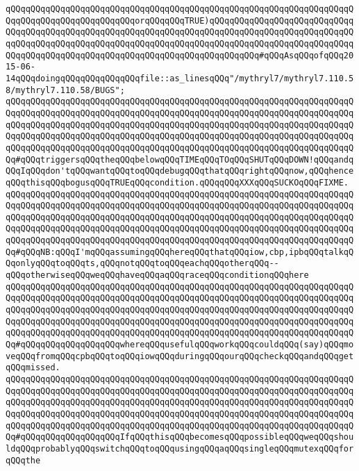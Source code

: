 \newline
\verb|qQQqqQQqqQQqqQQqqQQqqQQqqQQqqQQqqQQqqQQqqQQqqQQqqQQqqQQqqQQqqQQqqQQqqQQqqQQqqQQqqQQqqQQqqQQqqQQqorqQQqqQQqTRUE)qQQqqQQqqQQqqQQqqQQqqQQqqQQqqQQqqQQqqQQqqQQqqQQqqQQqqQQqqQQqqQQqqQQqqQQqqQQqqQQqqQQqqQQqqQQqqQQqqQQqqQQqqQQqqQQqqQQqqQQqqQQqqQQqqQQqqQQqqQQqqQQqqQQqqQQqqQQqqQQqqQQqqQQqqQQqqQQqqQQqqQQqqQQqqQQqqQQqqQQqqQQqqQQqqQQqqQQqqQQq#qQQqAsqQQqofqQQq2015-06-14qQQqdoingqQQqqQQqqQQqqQQqfile::as_linesqQQq"/mythryl7/mythryl7.110.58/mythryl7.110.58/BUGS";|\newline
\verb|qQQqqQQqqQQqqQQqqQQqqQQqqQQqqQQqqQQqqQQqqQQqqQQqqQQqqQQqqQQqqQQqqQQqqQQqqQQqqQQqqQQqqQQqqQQqqQQqqQQqqQQqqQQqqQQqqQQqqQQqqQQqqQQqqQQqqQQqqQQqqQQqqQQqqQQqqQQqqQQqqQQqqQQqqQQqqQQqqQQqqQQqqQQqqQQqqQQqqQQqqQQqqQQqqQQqqQQqqQQqqQQqqQQqqQQqqQQqqQQqqQQqqQQqqQQqqQQqqQQqqQQqqQQqqQQqqQQqqQQqqQQqqQQqqQQqqQQqqQQqqQQqqQQqqQQqqQQqqQQqqQQqqQQqqQQqqQQqqQQqqQQqqQQqqQQq#qQQqtriggersqQQqtheqQQqbelowqQQqTIMEqQQqTOqQQqSHUTqQQqDOWN!qQQqandqQQqIqQQqdon'tqQQqwantqQQqtoqQQqdebugqQQqthatqQQqrightqQQqnow,qQQqhenceqQQqthisqQQqbogusqQQqTRUEqQQqcondition.qQQqqQQqXXXqQQqSUCKOqQQqFIXME.|\newline
\newline
\verb|qQQqqQQqqQQqqQQqqQQqqQQqqQQqqQQqqQQqqQQqqQQqqQQqqQQqqQQqqQQqqQQqqQQqqQQqqQQqqQQqqQQqqQQqqQQqqQQqqQQqqQQqqQQqqQQqqQQqqQQqqQQqqQQqqQQqqQQqqQQqqQQqqQQqqQQqqQQqqQQqqQQqqQQqqQQqqQQqqQQqqQQqqQQqqQQqqQQqqQQqqQQqqQQqqQQqqQQqqQQqqQQqqQQqqQQqqQQqqQQqqQQqqQQqqQQqqQQqqQQqqQQqqQQqqQQqqQQqqQQqqQQqqQQqqQQqqQQqqQQqqQQqqQQqqQQqqQQqqQQqqQQqqQQqqQQqqQQqqQQqqQQqqQQqqQQq#qQQqNB:qQQqI'mqQQqassumingqQQqhereqQQqthatqQQqiow,cbp,ipbqQQqtalkqQQqonlyqQQqtoqQQqts,qQQqnotqQQqtoqQQqeachqQQqotherqQQq--qQQqotherwiseqQQqweqQQqhaveqQQqaqQQqraceqQQqconditionqQQqhere|\newline
\verb|qQQqqQQqqQQqqQQqqQQqqQQqqQQqqQQqqQQqqQQqqQQqqQQqqQQqqQQqqQQqqQQqqQQqqQQqqQQqqQQqqQQqqQQqqQQqqQQqqQQqqQQqqQQqqQQqqQQqqQQqqQQqqQQqqQQqqQQqqQQqqQQqqQQqqQQqqQQqqQQqqQQqqQQqqQQqqQQqqQQqqQQqqQQqqQQqqQQqqQQqqQQqqQQqqQQqqQQqqQQqqQQqqQQqqQQqqQQqqQQqqQQqqQQqqQQqqQQqqQQqqQQqqQQqqQQqqQQqqQQqqQQqqQQqqQQqqQQqqQQqqQQqqQQqqQQqqQQqqQQqqQQqqQQqqQQqqQQqqQQqqQQqqQQqqQQq#qQQqqQQqqQQqqQQqqQQqwhereqQQqusefulqQQqworkqQQqcouldqQQq(say)qQQqmoveqQQqfromqQQqcpbqQQqtoqQQqiowqQQqduringqQQqourqQQqcheckqQQqandqQQqgetqQQqmissed.|\newline
\verb|qQQqqQQqqQQqqQQqqQQqqQQqqQQqqQQqqQQqqQQqqQQqqQQqqQQqqQQqqQQqqQQqqQQqqQQqqQQqqQQqqQQqqQQqqQQqqQQqqQQqqQQqqQQqqQQqqQQqqQQqqQQqqQQqqQQqqQQqqQQqqQQqqQQqqQQqqQQqqQQqqQQqqQQqqQQqqQQqqQQqqQQqqQQqqQQqqQQqqQQqqQQqqQQqqQQqqQQqqQQqqQQqqQQqqQQqqQQqqQQqqQQqqQQqqQQqqQQqqQQqqQQqqQQqqQQqqQQqqQQqqQQqqQQqqQQqqQQqqQQqqQQqqQQqqQQqqQQqqQQqqQQqqQQqqQQqqQQqqQQqqQQqqQQqqQQq#qQQqqQQqqQQqqQQqqQQqIfqQQqthisqQQqbecomesqQQqpossibleqQQqweqQQqshouldqQQqprobablyqQQqswitchqQQqtoqQQqusingqQQqaqQQqsingleqQQqmutexqQQqforqQQqthe|\newline
